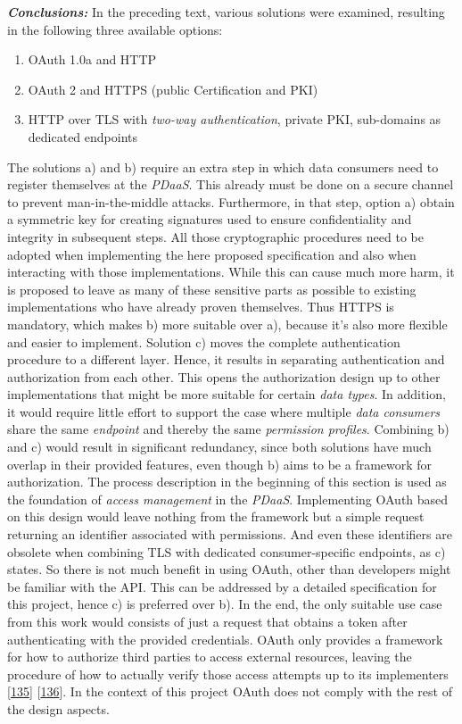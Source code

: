 \documentclass[12pt,english,a4paper,titlepage,cleardoublepage=empty,dottedtoc]{report}
\providecommand{\tightlist}{%
  \setlength{\itemsep}{0pt}\setlength{\parskip}{0pt}}
\begin{document}
\emph{\textbf{Conclusions:}} In the preceding text, various solutions
were examined, resulting in the following three available options:

\begin{enumerate}
\def\labelenumi{\alph{enumi})}
\tightlist
\item
  OAuth 1.0a and HTTP
\item
  OAuth 2 and HTTPS (public Certification and PKI)
\item
  HTTP over TLS with \emph{two-way authentication}, private PKI,
  sub-domains as dedicated endpoints
\end{enumerate}

The solutions a) and b) require an extra step in which data consumers
need to register themselves at the \emph{PDaaS}. This already must be
done on a secure channel to prevent man-in-the-middle attacks.
Furthermore, in that step, option a) obtain a symmetric key for creating
signatures used to ensure confidentiality and integrity in subsequent
steps. All those cryptographic procedures need to be adopted when
implementing the here proposed specification and also when interacting
with those implementations. While this can cause much more harm, it is
proposed to leave as many of these sensitive parts as possible to
existing implementations who have already proven themselves. Thus HTTPS
is mandatory, which makes b) more suitable over a), because it's also
more flexible and easier to implement. Solution c) moves the complete
authentication procedure to a different layer. Hence, it results in
separating authentication and authorization from each other. This opens
the authorization design up to other implementations that might be more
suitable for certain \emph{data types}. In addition, it would require
little effort to support the case where multiple \emph{data consumers}
share the same \emph{endpoint} and thereby the same \emph{permission
profiles}. Combining b) and c) would result in significant redundancy,
since both solutions have much overlap in their provided features, even
though b) aims to be a framework for authorization. The process
description in the beginning of this section is used as the foundation
of \emph{access management} in the \emph{PDaaS}. Implementing OAuth
based on this design would leave nothing from the framework but a simple
request returning an identifier associated with permissions. And even
these identifiers are obsolete when combining TLS with dedicated
consumer-specific endpoints, as c) states. So there is not much benefit
in using OAuth, other than developers might be familiar with the API.
This can be addressed by a detailed specification for this project,
hence c) is preferred over b). In the end, the only suitable use case
from this work would consists of just a request that obtains a token
after authenticating with the provided credentials. OAuth only provides
a framework for how to authorize third parties to access external
resources, leaving the procedure of how to actually verify those access
attempts up to its implementers
{[}\protect\hyperlink{ref-web_spec_oauth-1a_access-verification}{135}{]}
{[}\protect\hyperlink{ref-web_spec_oauth-2_access-verification}{136}{]}.
In the context of this project OAuth does not comply with the rest of
the design aspects.
\end{document}
